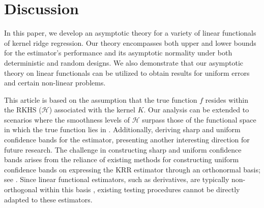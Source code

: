 \documentclass[12pt]{article}
\theoremstyle{plain}
\theoremstyle{remark}
\begin{document}
\section{Discussion}\label{Sec:discussion}

In this paper, we develop an asymptotic theory for a variety of linear functionals of kernel ridge regression. Our theory encompasses both upper and lower bounds for the estimator's performance and its asymptotic normality under both deterministic and random designs. 
We also demonstrate that our asymptotic theory on linear functionals can be utilized to obtain results for uniform errors and certain non-linear problems.


This article is based on the assumption that the true function $f$ resides within the RKHS ($\mathcal{H}$) associated with the kernel $K$. Our analysis can be extended to scenarios where the smoothness levels of $\mathcal{H}$ surpass those of the functional space in which the true function lies in \citep{fischer2020sobolev}. Additionally, deriving sharp and uniform confidence bands for the estimator, presenting another interesting direction for future research. The challenge in constructing sharp and uniform confidence bands arises from the reliance of existing methods for constructing  uniform confidence bands on expressing the KRR estimator through an orthonormal basis; see \cite{shang2013local, singhkernel}. Since linear functional estimators, such as derivatives, are typically non-orthogonal within this basis \citep{liu2023estimationanova}, existing testing procedures cannot be directly adapted to these estimators.
\end{document}

